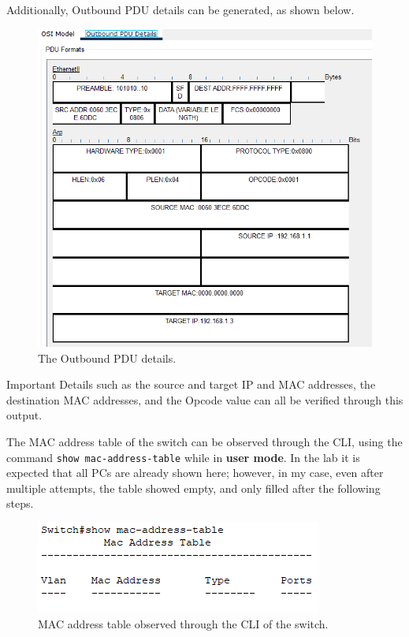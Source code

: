 \documentclass[a4paper,12pt]{article}
\begin{document}
Additionally, Outbound PDU details can be generated, as shown below.
\begin{figure}[H]
\centering
\includegraphics[width=\linewidth, height=0.55\textheight, keepaspectratio]{Pictures_Lab1/Outbound PDU details obj 6 .png}
\caption{The Outbound PDU details.}
\end{figure}
Important Details such as the source and target IP and MAC addresses, the destination MAC addresses, and the Opcode value can all be verified through this output.

The MAC address table of the switch can be observed through the CLI, using the command \texttt{show mac-address-table} while in \textbf{user mode}. In the lab it is expected that all PCs are already shown here; however, in my case, even after multiple attempts, the table showed empty, and only filled after the following steps.
\begin{figure}[H]
\centering
\includegraphics[width=\linewidth, height=0.15\textheight, keepaspectratio]{Pictures_Lab1/mac address obj6.7.png}
\caption{MAC address table observed through the CLI of the switch.}
\end{figure}
\end{document}
